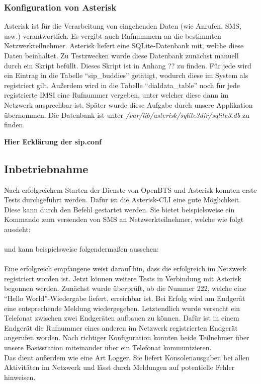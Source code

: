 \subsubsection{Konfiguration von Asterisk}
Asterisk ist für die Verarbeitung von eingehenden Daten (wie Anrufen, SMS, usw.) verantwortlich. Es vergibt auch Rufnummern an die bestimmten Netzwerkteilnehmer. Asterisk liefert eine SQLite-Datenbank mit, welche diese Daten beinhaltet. Zu Testzwecken wurde diese Datenbank zunächst manuell durch ein Skript befüllt. Dieses Skript ist in Anhang ?? zu finden. Für jede \IMSI wird ein Eintrag in die Tabelle ``sip\_buddies'' getätigt, wodurch diese \IMSI im System als registriert gilt. Außerdem wird in die Tabelle ``dialdata\_table'' noch für jede registrierte IMSI eine Rufnummer vergeben, unter welcher diese dann im Netzwerk ansprechbar ist. Später wurde diese Aufgabe durch unsere Applikation übernommen. Die Datenbank ist unter \textit{/var/lib/asterisk/sqlite3dir/sqlite3.db} zu finden.

\textbf{Hier Erklärung der sip.conf}

\subsection{Inbetriebnahme}
\label{sec:inbetriebnahme}
Nach erfolgreichem Starten der Dienste von OpenBTS und Asterisk konnten erste Tests durchgeführt werden. Dafür ist die Asterisk-CLI eine gute Möglichkeit. Diese kann durch den Befehl  gestartet werden. Sie bietet beispielsweise ein Kommando zum versenden von SMS an Netzwerkteilnehmer, welche wie folgt aussieht:\\
\\
und kann beispielsweise folgendermaßen aussehen:\\
\\
Eine erfolgreich empfangene \SMS weist darauf hin, dass die \IMSI erfolgreich im Netzwerk registriert worden ist. Jetzt können weitere Tests in Verbindung mit Asterisk begonnen werden. Zunächst wurde überprüft, ob die Nummer 222, welche eine ``Hello World''-Wiedergabe liefert, erreichbar ist. Bei Erfolg wird am Endgerät eine entsprechende Meldung wiedergegeben. Letztendlich wurde versucht ein Telefonat zwischen zwei Endgeräten aufbauen zu können. Dafür ist in einem Endgerät die Rufnummer eines anderen im Netzwerk registrierten Endgerät angerufen worden. Nach richtiger Konfiguration konnten beide Teilnehmer über unsere Basisstation miteinander über ein Telefonat kommunizieren. \\
Das \CLI dient außerdem wie eine Art Logger. Sie liefert Konsolenausgaben bei allen Aktivitäten im Netzwerk und lässt durch Meldungen auf potentielle Fehler hinweisen. 

